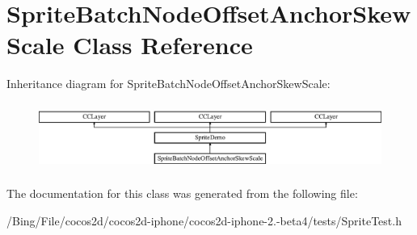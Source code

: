 \hypertarget{interface_sprite_batch_node_offset_anchor_skew_scale}{\section{Sprite\-Batch\-Node\-Offset\-Anchor\-Skew\-Scale Class Reference}
\label{interface_sprite_batch_node_offset_anchor_skew_scale}
}
Inheritance diagram for Sprite\-Batch\-Node\-Offset\-Anchor\-Skew\-Scale\-:\begin{figure}[H]
\begin{center}
\leavevmode
\includegraphics[height=2.213439cm]{interface_sprite_batch_node_offset_anchor_skew_scale}
\end{center}
\end{figure}


The documentation for this class was generated from the following file\-:\begin{DoxyCompactItemize}
\item 
/\-Bing/\-File/cocos2d/cocos2d-\/iphone/cocos2d-\/iphone-\/2.-\/beta4/tests/Sprite\-Test.\-h\end{DoxyCompactItemize}
